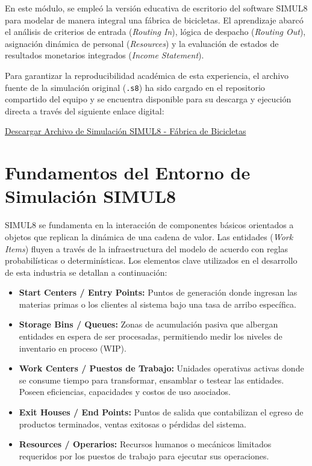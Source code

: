 \documentclass[runningheads]{llncs}
\begin{document}
En este módulo, se empleó la versión educativa de escritorio del software SIMUL8 para modelar de manera integral una fábrica de bicicletas. El aprendizaje abarcó el análisis de criterios de entrada (\textit{Routing In}), lógica de despacho (\textit{Routing Out}), asignación dinámica de personal (\textit{Resources}) y la evaluación de estados de resultados monetarios integrados (\textit{Income Statement}). 

Para garantizar la reproducibilidad académica de esta experiencia, el archivo fuente de la simulación original (\texttt{.s8}) ha sido cargado en el repositorio compartido del equipo y se encuentra disponible para su descarga y ejecución directa a través del siguiente enlace digital: \\
\centerline{\href{https://drive.google.com/file/d/1iTyWoyoCG0DxSOM37P7rbQEZHBQsWhyl/view?usp=sharing}{Descargar Archivo de Simulación SIMUL8 - Fábrica de Bicicletas}}

\section{Fundamentos del Entorno de Simulación SIMUL8}
SIMUL8 se fundamenta en la interacción de componentes básicos orientados a objetos que replican la dinámica de una cadena de valor. Las entidades (\textit{Work Items}) fluyen a través de la infraestructura del modelo de acuerdo con reglas probabilísticas o determinísticas. Los elementos clave utilizados en el desarrollo de esta industria se detallan a continuación:

\begin{itemize}
    \item \textbf{Start Centers / Entry Points:} Puntos de generación donde ingresan las materias primas o los clientes al sistema bajo una tasa de arribo específica.
    \item \textbf{Storage Bins / Queues:} Zonas de acumulación pasiva que albergan entidades en espera de ser procesadas, permitiendo medir los niveles de inventario en proceso (WIP).
    \item \textbf{Work Centers / Puestos de Trabajo:} Unidades operativas activas donde se consume tiempo para transformar, ensamblar o testear las entidades. Poseen eficiencias, capacidades y costos de uso asociados.
    \item \textbf{Exit Houses / End Points:} Puntos de salida que contabilizan el egreso de productos terminados, ventas exitosas o pérdidas del sistema.
    \item \textbf{Resources / Operarios:} Recursos humanos o mecánicos limitados requeridos por los puestos de trabajo para ejecutar sus operaciones.
\end{itemize}
\end{document}

